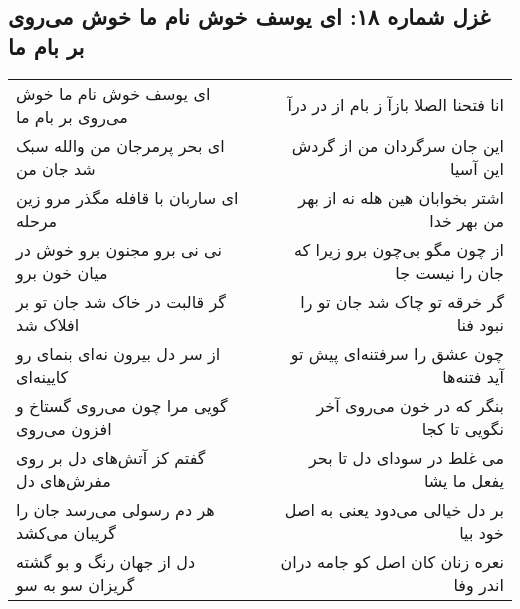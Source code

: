 \begin{center}
\section*{غزل شماره ۱۸: ای یوسف خوش نام ما خوش می‌روی بر بام ما}
\label{sec:0018}
\begin{longtable}{l p{0.5cm} r}
ای یوسف خوش نام ما خوش می‌روی بر بام ما
&&
انا فتحنا الصلا بازآ ز بام از در درآ
\\
ای بحر پرمرجان من والله سبک شد جان من
&&
این جان سرگردان من از گردش این آسیا
\\
ای ساربان با قافله مگذر مرو زین مرحله
&&
اشتر بخوابان هین هله نه از بهر من بهر خدا
\\
نی نی برو مجنون برو خوش در میان خون برو
&&
از چون مگو بی‌چون برو زیرا که جان را نیست جا
\\
گر قالبت در خاک شد جان تو بر افلاک شد
&&
گر خرقه تو چاک شد جان تو را نبود فنا
\\
از سر دل بیرون نه‌ای بنمای رو کایینه‌ای
&&
چون عشق را سرفتنه‌ای پیش تو آید فتنه‌ها
\\
گویی مرا چون می‌روی گستاخ و افزون می‌روی
&&
بنگر که در خون می‌روی آخر نگویی تا کجا
\\
گفتم کز آتش‌های دل بر روی مفرش‌های دل
&&
می غلط در سودای دل تا بحر یفعل ما یشا
\\
هر دم رسولی می‌رسد جان را گریبان می‌کشد
&&
بر دل خیالی می‌دود یعنی به اصل خود بیا
\\
دل از جهان رنگ و بو گشته گریزان سو به سو
&&
نعره زنان کان اصل کو جامه دران اندر وفا
\\
\end{longtable}
\end{center}
